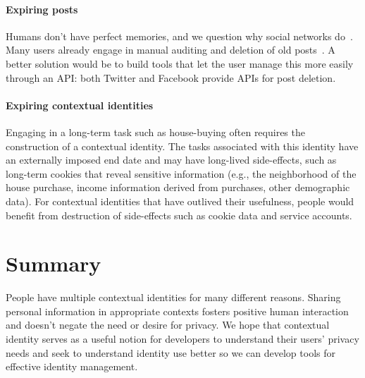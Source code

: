\documentclass[10pt, conference, compsocconf]{IEEEtran}
\begin{document}
\paragraph{Expiring posts}
Humans don't have perfect memories, and we question why social networks
do~\cite{delete}. Many users already engage in manual auditing and
deletion of old posts~\cite{fbtips2}. A better solution would be to build tools
that let the user manage this more easily through an API: both Twitter and
Facebook provide APIs for post deletion.

\paragraph{Expiring contextual identities}
Engaging in a long-term task such as house-buying often requires the
construction of a contextual identity. The tasks associated with this identity
have an externally imposed end date and may have long-lived side-effects, such
as long-term cookies that reveal sensitive information (e.g., the neighborhood
of the house purchase, income information derived from purchases, other
demographic data). For contextual identities that have outlived their
usefulness, people would benefit from destruction of side-effects such as cookie
data and service accounts.

\section{Summary}
People have multiple contextual identities for many different reasons. Sharing personal information in
appropriate contexts fosters positive human interaction and doesn't negate the need or desire for privacy. We hope that
contextual identity serves as a useful notion for developers to understand
their users' privacy needs and seek to understand identity use better so we can develop tools for effective identity management.

\begin{comment}
\section{Acknowledgments}
The authors thank
Lucas Adamski
Ben Adida
Mike Connor
Chris Karlof
\end{comment}



\end{document}
